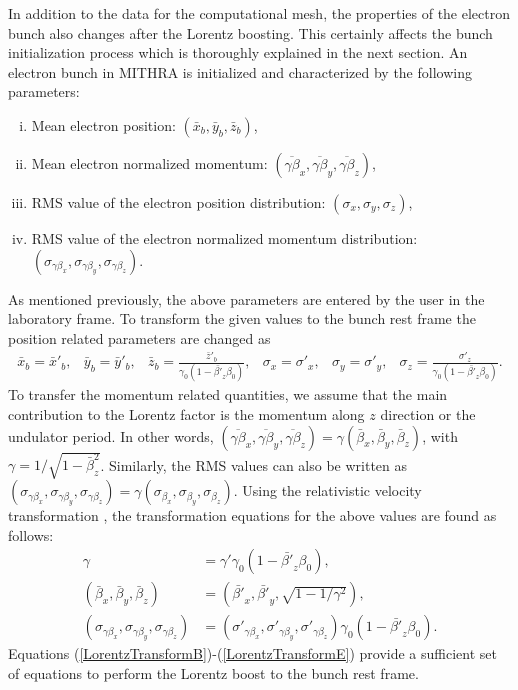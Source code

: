 In addition to the data for the computational mesh, the properties of the electron bunch also changes after the Lorentz boosting.
%
This certainly affects the bunch initialization process which is thoroughly explained in the next section.
%
An electron bunch in MITHRA is initialized and characterized by the following parameters:
%
\begin{enumerate}[(i)]
\item Mean electron position: $(\bar{x}_b, \bar{y}_b, \bar{z}_b)$,
\item Mean electron normalized momentum: $(\overline{\gamma \beta}_x, \overline{\gamma \beta}_y, \overline{\gamma \beta}_z)$,
\item RMS value of the electron position distribution: $(\sigma_x, \sigma_y, \sigma_z)$,
\item RMS value of the electron normalized momentum distribution: $(\sigma_{\gamma \beta_x}, \sigma_{\gamma \beta_y}, \sigma_{\gamma \beta_z})$.
\end{enumerate}
%
As mentioned previously, the above parameters are entered by the user in the laboratory frame.
%
To transform the given values to the bunch rest frame the position related parameters are changed as
%
\begin{equation}
\begin{array}{cccccc}
\bar{x}_b = \bar{x}'_b, & \bar{y}_b = \bar{y}'_b, & \bar{z}_b = \displaystyle \frac{\bar{z}'_b}{\gamma_0 (1 - \bar{\beta'}_z \beta_0)} , & \sigma_x = \sigma'_x, & \sigma_y = \sigma'_y, & \sigma_z = \displaystyle \frac{\sigma'_z}{{\gamma_0 (1 - \bar{\beta'}_z \beta_0)}}.
\end{array}
\end{equation}
%
To transfer the momentum related quantities, we assume that the main contribution to the Lorentz factor is the momentum along $z$ direction or the undulator period.
%
In other words, $(\overline{\gamma \beta}_x, \overline{\gamma \beta}_y, \overline{\gamma \beta}_z) = \gamma ( \bar{\beta}_x, \bar{\beta}_y, \bar{\beta}_z )$, with $\gamma = 1/\sqrt{1-\bar{\beta}_z^2}$.
%
Similarly, the RMS values can also be written as $(\sigma_{\gamma \beta_x}, \sigma_{\gamma \beta_y}, \sigma_{\gamma \beta_z}) = \gamma (\sigma_{\beta_x}, \sigma_{\beta_y}, \sigma_{\beta_z})$.
%
Using the relativistic velocity transformation \cite{JacksonClassical}, the transformation equations for the above values are found as follows:
%
\begin{align}
\gamma & = \gamma' \gamma_0 (1 - \bar{\beta'}_z \beta_0), \\
( \bar{\beta}_x, \bar{\beta}_y, \bar{\beta}_z ) & = ( \bar{\beta'}_x, \bar{\beta'}_y, \sqrt{1 - 1/\gamma^2} ), \\
(\sigma_{\gamma \beta_x}, \sigma_{\gamma \beta_y}, \sigma_{\gamma \beta_z}) & = (\sigma'_{\gamma \beta_x}, \sigma'_{\gamma \beta_y}, \sigma'_{\gamma \beta_z} ) \gamma_0 (1 - \bar{\beta'}_z \beta_0). \label{LorentzTransformE}
\end{align}
%
Equations (\ref{LorentzTransformB})-(\ref{LorentzTransformE}) provide a sufficient set of equations to perform the Lorentz boost to the bunch rest frame.

